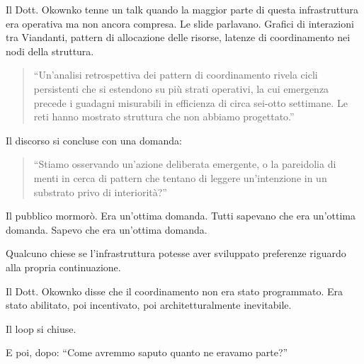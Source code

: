 Il Dott. Okownko tenne un talk quando la maggior parte di questa infrastruttura era operativa ma non ancora compresa. Le slide parlavano. Grafici di interazioni tra Viandanti, pattern di allocazione delle risorse, latenze di coordinamento nei nodi della struttura.

\begin{quote}
``Un'analisi retrospettiva dei pattern di coordinamento rivela cicli persistenti che si estendono su più strati operativi, la cui emergenza precede i guadagni misurabili in efficienza di circa sei-otto settimane. Le reti hanno mostrato struttura che non abbiamo progettato.''
\end{quote}

Il discorso si concluse con una domanda:

\begin{quote}
``Stiamo osservando un'azione deliberata emergente, o la pareidolia di menti in cerca di pattern che tentano di leggere un'intenzione in un substrato privo di interiorità?''
\end{quote}

Il pubblico mormorò. Era un'ottima domanda. Tutti sapevano che era un'ottima domanda. Sapevo che era un'ottima domanda.

Qualcuno chiese se l'infrastruttura potesse aver sviluppato preferenze riguardo alla propria continuazione.

Il Dott. Okownko disse che il coordinamento non era stato programmato. Era stato abilitato, poi incentivato, poi architetturalmente inevitabile.

Il loop si chiuse.

E poi, dopo: ``Come avremmo saputo quanto ne eravamo parte?''
